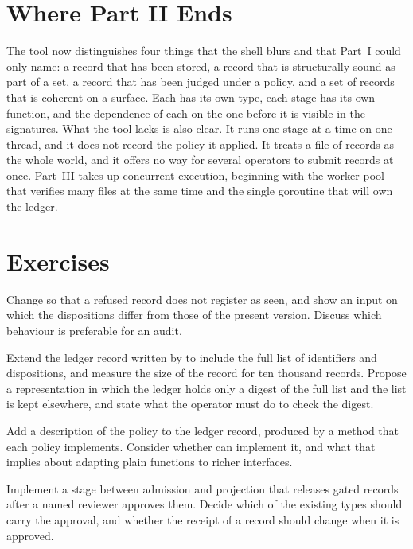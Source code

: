\section{Where Part II Ends}

The tool now distinguishes four things that the shell blurs and that Part~I could only name: a record that has been stored, a record that is structurally sound as part of a set, a record that has been judged under a policy, and a set of records that is coherent on a surface. Each has its own type, each stage has its own function, and the dependence of each on the one before it is visible in the signatures. What the tool lacks is also clear. It runs one stage at a time on one thread, and it does not record the policy it applied. It treats a file of records as the whole world, and it offers no way for several operators to submit records at once. Part~III takes up concurrent execution, beginning with the worker pool that verifies many files at the same time and the single goroutine that will own the ledger.

\section*{Exercises}

\begin{exercise}
Change  so that a refused record does not register as seen, and show an input on which the dispositions differ from those of the present version. Discuss which behaviour is preferable for an audit.
\end{exercise}

\begin{exercise}
Extend the ledger record written by  to include the full list of identifiers and dispositions, and measure the size of the record for ten thousand records. Propose a representation in which the ledger holds only a digest of the full list and the list is kept elsewhere, and state what the operator must do to check the digest.
\end{exercise}

\begin{exercise}
Add a description of the policy to the ledger record, produced by a  method that each policy implements. Consider whether  can implement it, and what that implies about adapting plain functions to richer interfaces.
\end{exercise}

\begin{exercise}
Implement a stage between admission and projection that releases gated records after a named reviewer approves them. Decide which of the existing types should carry the approval, and whether the receipt of a record should change when it is approved.
\end{exercise}
